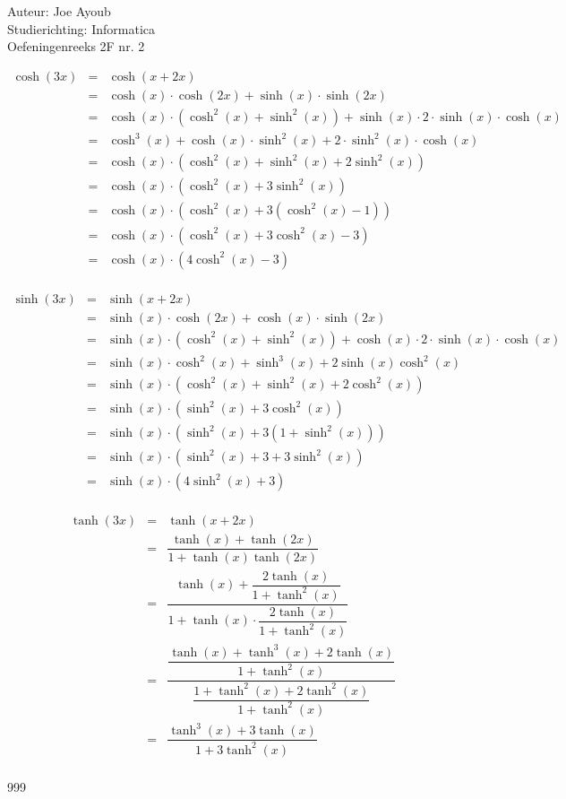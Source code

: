 \documentclass[a4paper]{article}
\begin{document}
  
\noindent \large Auteur: Joe Ayoub \\
\noindent \large Studierichting: Informatica\\
\noindent \large Oefeningenreeks 2F nr. 2\\

\medskip

\normalsize

\begin{eqnarray*}
\cosh(3x) & = & \cosh(x + 2x) \\
& = & \cosh(x) \cdot \cosh(2x) + \sinh(x) \cdot \sinh(2x) \\
& = & \cosh(x) \cdot (\cosh^2(x) + \sinh^2(x)) + \sinh(x) \cdot 2 \cdot \sinh(x) \cdot \cosh(x) \\
& = & \cosh^3(x) + \cosh(x) \cdot \sinh^2(x) + 2 \cdot \sinh^2(x) \cdot \cosh(x) \\
& = & \cosh(x) \cdot (\cosh^2(x) + \sinh^2(x) + 2\sinh^2(x)) \\
& = & \cosh(x) \cdot (\cosh^2(x) + 3\sinh^2(x)) \\
& = & \cosh(x) \cdot (\cosh^2(x) + 3(\cosh^2(x)-1)) \\
& = & \cosh(x) \cdot (\cosh^2(x) + 3\cosh^2(x) - 3) \\
& = & \cosh(x) \cdot (4\cosh^2(x) - 3) \\
\end{eqnarray*}


\begin{eqnarray*}
\sinh(3x) & = & \sinh(x + 2x) \\
& = & \sinh(x) \cdot \cosh(2x) + \cosh(x) \cdot \sinh(2x) \\
& = & \sinh(x) \cdot (\cosh^2(x) + \sinh^2(x)) + \cosh(x) \cdot 2 \cdot \sinh(x) \cdot \cosh(x) \\
& = & \sinh(x) \cdot \cosh^2(x) + \sinh^3(x) + 2\sinh(x)\cosh^2(x) \\
& = & \sinh(x) \cdot (\cosh^2(x) + \sinh^2(x) + 2\cosh^2(x)) \\
& = & \sinh(x) \cdot (\sinh^2(x) + 3\cosh^2(x)) \\
& = & \sinh(x) \cdot (\sinh^2(x) + 3(1 + \sinh^2(x))) \\
& = & \sinh(x) \cdot (\sinh^2(x) + 3 + 3\sinh^2(x)) \\
& = & \sinh(x) \cdot (4\sinh^2(x) + 3) \\
\end{eqnarray*}


\begin{eqnarray*}
\tanh(3x) & = & \tanh(x + 2x) \\
& = & \dfrac{\tanh(x) + \tanh(2x)}{1 + \tanh(x)\tanh(2x)} \\
& = & \dfrac{\tanh(x) + \dfrac{2\tanh(x)}{1 + \tanh^2(x)}}{1 + \tanh(x) \cdot \dfrac{2\tanh(x)}{1 + \tanh^2(x)}} \\
& = & \dfrac{\dfrac{\tanh(x) + \tanh^3(x) + 2\tanh(x)}{1 + \tanh^2(x)}}{\dfrac{1 + \tanh^2(x) + 2\tanh^2(x)}{1 + \tanh^2(x)}} \\
& = & \dfrac{\tanh^3(x) + 3\tanh(x)}{1 + 3\tanh^2(x)} \\
\end{eqnarray*}


\begin{thebibliography}{999}


\end{thebibliography}
\end{document}
